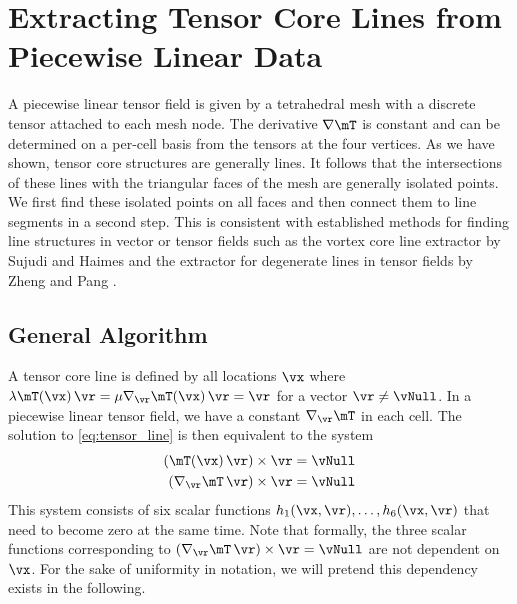 %
\section{Extracting Tensor Core Lines from Piecewise Linear Data} %
\label{sec:extracting_tensor_lines}
%
A piecewise linear tensor field is given by a tetrahedral mesh with a discrete
tensor attached to each mesh node.
%
The derivative $\nabla \mT$ is constant and can be determined on a per-cell
basis from the tensors at the four vertices.
%
%
As we have shown, tensor core structures are generally lines.
%
It follows that the intersections of these lines with the triangular faces of
the mesh are generally isolated points.
%
We first find these isolated points on all faces and then connect them to line
segments in a second step.
%
This is consistent with established methods for finding line structures in
vector or tensor fields such as the vortex core line extractor by Sujudi and
Haimes \cite{Sujudi1995} and the extractor for degenerate lines in tensor fields
by Zheng and Pang \cite{Zheng2004}.
%

\subsection{General Algorithm} %
\label{sub:general_algorithm}
%
A tensor core line is defined by all locations $\vx$ where
$\lambda \mT(\vx) \, \vr = \mu \nabla_{\vr} \mT(\vx)\, \vr = \vr$
for a vector $\vr \neq \vNull$.
%
In a piecewise linear tensor field, we have a constant $\nabla_{\vr} \mT$
in each cell.
%
The solution to \eqref{eq:tensor_line} is then equivalent to the system
%
\begin{equation}\label{eq:targetfunctions}
\begin{aligned}
  (\mT(\vx)\,\vr) \times \vr &= \vNull\\
  (\nabla_{\vr} \mT\, \vr) \times \vr &= \vNull
\end{aligned}
\end{equation}
%
This system consists of six scalar functions $h_1(\vx, \vr), \dots, h_6(\vx,
\vr)$ that need to become zero at the same time.
%
Note that formally, the three scalar functions corresponding to $(\nabla_{\vr}
\mT\, \vr) \times \vr = \vNull$ are not dependent on $\vx$.
%
For the sake of uniformity in notation, we will pretend this dependency
exists in the following.
%

